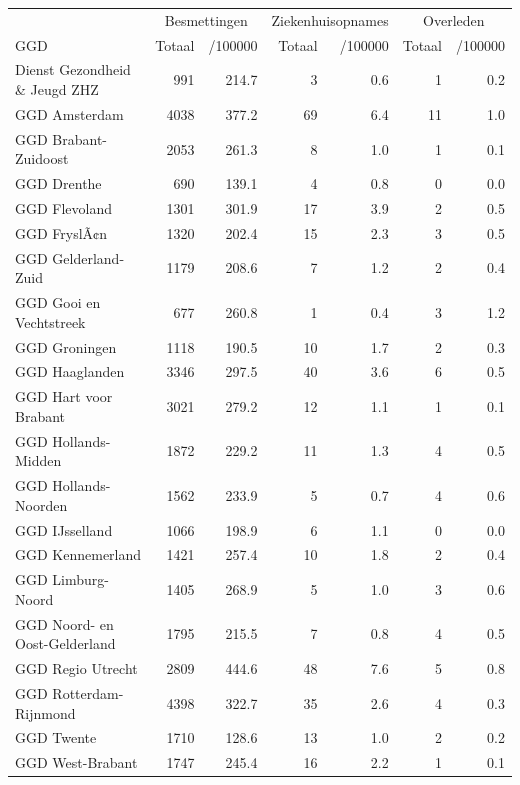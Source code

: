 \documentclass[
  english,
  man,floatsintext]{apa6}
\begin{document}
\begin{table}
\centering\begingroup\fontsize{10}{12}\selectfont

\begin{threeparttable}
\begin{tabular}{lrrrrrr}
\toprule
\multicolumn{1}{c}{ } & \multicolumn{2}{c}{Besmettingen} & \multicolumn{2}{c}{Ziekenhuisopnames} & \multicolumn{2}{c}{Overleden} \\
\cmidrule(l{3pt}r{3pt}){2-3} \cmidrule(l{3pt}r{3pt}){4-5} \cmidrule(l{3pt}r{3pt}){6-7}
GGD & Totaal & /100000 & Totaal & /100000 & Totaal & /100000\\
\midrule
Dienst Gezondheid \& Jeugd ZHZ & 991 & 214.7 & 3 & 0.6 & 1 & 0.2\\
GGD Amsterdam & 4038 & 377.2 & 69 & 6.4 & 11 & 1.0\\
GGD Brabant-Zuidoost & 2053 & 261.3 & 8 & 1.0 & 1 & 0.1\\
GGD Drenthe & 690 & 139.1 & 4 & 0.8 & 0 & 0.0\\
GGD Flevoland & 1301 & 301.9 & 17 & 3.9 & 2 & 0.5\\
GGD FryslÃ¢n & 1320 & 202.4 & 15 & 2.3 & 3 & 0.5\\
GGD Gelderland-Zuid & 1179 & 208.6 & 7 & 1.2 & 2 & 0.4\\
GGD Gooi en Vechtstreek & 677 & 260.8 & 1 & 0.4 & 3 & 1.2\\
GGD Groningen & 1118 & 190.5 & 10 & 1.7 & 2 & 0.3\\
GGD Haaglanden & 3346 & 297.5 & 40 & 3.6 & 6 & 0.5\\
GGD Hart voor Brabant & 3021 & 279.2 & 12 & 1.1 & 1 & 0.1\\
GGD Hollands-Midden & 1872 & 229.2 & 11 & 1.3 & 4 & 0.5\\
GGD Hollands-Noorden & 1562 & 233.9 & 5 & 0.7 & 4 & 0.6\\
GGD IJsselland & 1066 & 198.9 & 6 & 1.1 & 0 & 0.0\\
GGD Kennemerland & 1421 & 257.4 & 10 & 1.8 & 2 & 0.4\\
GGD Limburg-Noord & 1405 & 268.9 & 5 & 1.0 & 3 & 0.6\\
GGD Noord- en Oost-Gelderland & 1795 & 215.5 & 7 & 0.8 & 4 & 0.5\\
GGD Regio Utrecht & 2809 & 444.6 & 48 & 7.6 & 5 & 0.8\\
GGD Rotterdam-Rijnmond & 4398 & 322.7 & 35 & 2.6 & 4 & 0.3\\
GGD Twente & 1710 & 128.6 & 13 & 1.0 & 2 & 0.2\\
GGD West-Brabant & 1747 & 245.4 & 16 & 2.2 & 1 & 0.1\\

\end{tabular}
\end{threeparttable}
\end{table}
\end{document}
